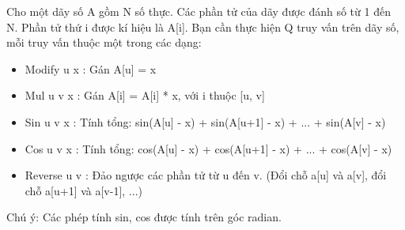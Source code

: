 Cho một dãy số A gồm N số thực. Các phần tử của dãy được đánh số từ 1 đến N. Phần tử thứ i được kí hiệu là A[i]. Bạn cần thực hiện Q truy vấn trên dãy số, mỗi truy vấn thuộc một trong các dạng:  
\begin{itemize}
	\item     Modify u x : Gán A[u] = x   
	\item     Mul u v x : Gán A[i] = A[i] * x, với i thuộc [u, v]   
	\item     Sin u v x : Tính tổng: sin(A[u] - x) + sin(A[u+1] - x) + ... + sin(A[v] - x)   
	\item     Cos u v x : Tính tổng: cos(A[u] - x) + cos(A[u+1] - x) + ... + cos(A[v] - x)   
	\item     Reverse u v : Đảo ngược các phần tử từ u đến v. (Đổi chỗ a[u] và a[v], đổi chỗ a[u+1] và a[v-1], ...)   
\end{itemize}

   Chú ý: Các phép tính sin, cos được tính trên góc radian.